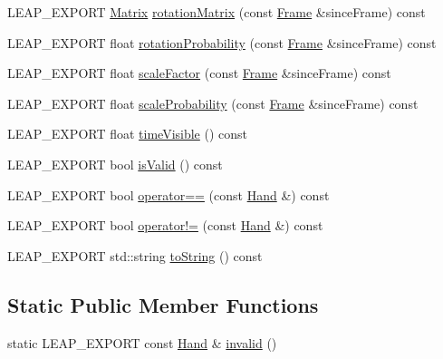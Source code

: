 \begin{DoxyCompactItemize}
\item 
L\+E\+A\+P\+\_\+\+E\+X\+P\+O\+R\+T \hyperlink{struct_leap_1_1_matrix}{Matrix} \hyperlink{class_leap_1_1_hand_a3b1ba5cdfb5fe951efb3ae8e40003dd3}{rotation\+Matrix} (const \hyperlink{class_leap_1_1_frame}{Frame} \&since\+Frame) const 
\item 
L\+E\+A\+P\+\_\+\+E\+X\+P\+O\+R\+T float \hyperlink{class_leap_1_1_hand_ad58c9fca2449308414f1913b0cd1f2ea}{rotation\+Probability} (const \hyperlink{class_leap_1_1_frame}{Frame} \&since\+Frame) const 
\item 
L\+E\+A\+P\+\_\+\+E\+X\+P\+O\+R\+T float \hyperlink{class_leap_1_1_hand_a883f70b457f82c8aec98044f5d804e04}{scale\+Factor} (const \hyperlink{class_leap_1_1_frame}{Frame} \&since\+Frame) const 
\item 
L\+E\+A\+P\+\_\+\+E\+X\+P\+O\+R\+T float \hyperlink{class_leap_1_1_hand_aef4ee9678c91b3736f1a38ab3fdc275c}{scale\+Probability} (const \hyperlink{class_leap_1_1_frame}{Frame} \&since\+Frame) const 
\item 
L\+E\+A\+P\+\_\+\+E\+X\+P\+O\+R\+T float \hyperlink{class_leap_1_1_hand_a1e31a80fae1add698594a69aefecd97e}{time\+Visible} () const 
\item 
L\+E\+A\+P\+\_\+\+E\+X\+P\+O\+R\+T bool \hyperlink{class_leap_1_1_hand_a2beb2a30fd07dbb5816bdd0af832bf75}{is\+Valid} () const 
\item 
L\+E\+A\+P\+\_\+\+E\+X\+P\+O\+R\+T bool \hyperlink{class_leap_1_1_hand_a986929015b89eaf88a5ea2b8dba6b8a8}{operator==} (const \hyperlink{class_leap_1_1_hand}{Hand} \&) const 
\item 
L\+E\+A\+P\+\_\+\+E\+X\+P\+O\+R\+T bool \hyperlink{class_leap_1_1_hand_abaaee341121479a96c249a554dff0272}{operator!=} (const \hyperlink{class_leap_1_1_hand}{Hand} \&) const 
\item 
L\+E\+A\+P\+\_\+\+E\+X\+P\+O\+R\+T std\+::string \hyperlink{class_leap_1_1_hand_aea9df4c2aa365178805648642da8644e}{to\+String} () const 
\end{DoxyCompactItemize}
\subsection*{Static Public Member Functions}
\begin{DoxyCompactItemize}
\item 
static L\+E\+A\+P\+\_\+\+E\+X\+P\+O\+R\+T const \hyperlink{class_leap_1_1_hand}{Hand} \& \hyperlink{class_leap_1_1_hand_ae66c7683d1c179cb3fa1913be320ea6a}{invalid} ()
\end{DoxyCompactItemize}
